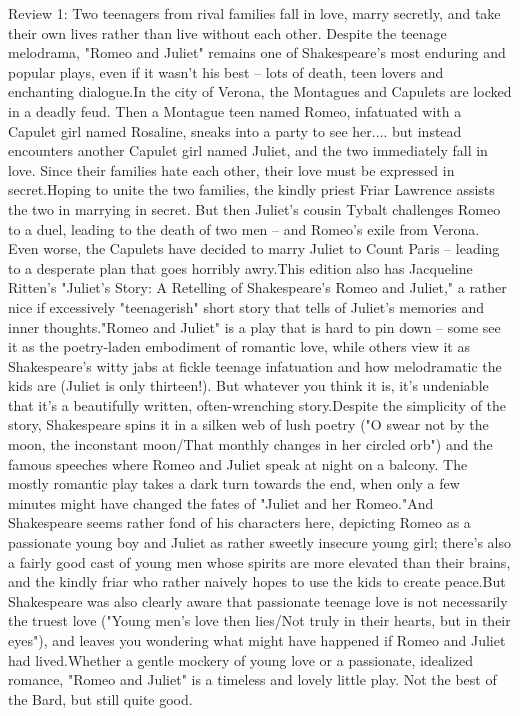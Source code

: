 \documentclass[12pt, a4paper[]{article}
\begin{document}
\begin{itemize}
    {\fontsize{9pt}{11pt}\selectfont
    \item Review 1: Two teenagers from rival families fall in love, marry secretly, and take their own lives rather than live without each other. Despite the teenage melodrama, "Romeo and Juliet" remains one of Shakespeare's most enduring and popular plays, even if it wasn't his best -- lots of death, teen lovers and enchanting dialogue.In the city of Verona, the Montagues and Capulets are locked in a deadly feud. Then a Montague teen named Romeo, infatuated with a Capulet girl named Rosaline, sneaks into a party to see her.... but instead encounters another Capulet girl named Juliet, and the two immediately fall in love. Since their families hate each other, their love must be expressed in secret.Hoping to unite the two families, the kindly priest Friar Lawrence assists the two in marrying in secret. But then Juliet's cousin Tybalt challenges Romeo to a duel, leading to the death of two men -- and Romeo's exile from Verona. Even worse, the Capulets have decided to marry Juliet to Count Paris -- leading to a desperate plan that goes horribly awry.This edition also has Jacqueline Ritten's "Juliet's Story: A Retelling of Shakespeare's Romeo and Juliet," a rather nice if excessively "teenagerish" short story that tells of Juliet's memories and inner thoughts."Romeo and Juliet" is a play that is hard to pin down -- some see it as the poetry-laden embodiment of romantic love, while others view it as Shakespeare's witty jabs at fickle teenage infatuation and how melodramatic the kids are (Juliet is only thirteen!). But whatever you think it is, it's undeniable that it's a beautifully written, often-wrenching story.Despite the simplicity of the story, Shakespeare spins it in a silken web of lush poetry ("O swear not by the moon, the inconstant moon/That monthly changes in her circled orb") and the famous speeches where Romeo and Juliet speak at night on a balcony. The mostly romantic play takes a dark turn towards the end, when only a few minutes might have changed the fates of "Juliet and her Romeo."And Shakespeare seems rather fond of his characters here, depicting Romeo as a passionate young boy and Juliet as rather sweetly insecure young girl; there's also a fairly good cast of young men whose spirits are more elevated than their brains, and the kindly friar who rather naively hopes to use the kids to create peace.But Shakespeare was also clearly aware that passionate teenage love is not necessarily the truest love ("Young men's love then lies/Not truly in their hearts, but in their eyes"), and leaves you wondering what might have happened if Romeo and Juliet had lived.Whether a gentle mockery of young love or a passionate, idealized romance, "Romeo and Juliet" is a timeless and lovely little play. Not the best of the Bard, but still quite good.
}
\end{itemize}
\end{document}
